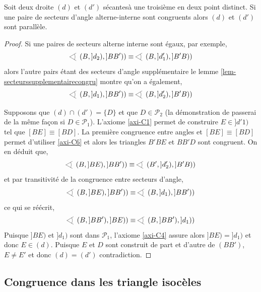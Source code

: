 \begin{thm}
    Soit deux droite $(d)$ et $(d')$ sécantesà une troisième en deux point distinct. Si une paire de secteurs d'angle alterne-interne sont congruents alors $(d)$ et $(d')$ sont parallèle.  
\begin{proof}
    Si une paires de secteurs alterne interne sont égaux, par exemple,
    \begin{equation*}
        \anglesaillant\left(B,]d_2),]BB')\right) \equiv \anglesaillant\left(B,]d_1'),]B'B)\right)
    \end{equation*}
    alors l'autre pairs étant des secteurs d'angle supplémentaire le lemme \ref{lem-secteurssupplementairecongru} montre qu'on a également,
    \begin{equation*}
        \anglesaillant\left(B,]d_1),]BB')\right) \equiv \anglesaillant\left(B,]d_2'),]B'B)\right)
    \end{equation*}

    Supposons que $(d)\cap(d')=\{D\}$ et que $D \in \mathcal{P}_2$ (la démonstration de passerai de la même façon si $D\in\mathcal{P}_1$). L'axiome \ref{axi-C1} permet de construire $E\in ]d'1)$ tel que $[BE]\equiv [BD]$. La première congruence entre angles et $[BE]\equiv [BD]$ permet d'utiliser \ref{axi-C6} et alors les triangles $B'B E$ et $BB'D$ sont congruent. On en déduit que,
    \begin{equation*}
        \anglesaillant\left(B,]BE),]BB')\right)\equiv \anglesaillant\left(B',]d_2'),]B'B)\right)
    \end{equation*}
    et par transitivité de la congruence entre secteurs d'angle, 
    \begin{equation*}
        \anglesaillant\left(B,]BE),]BB')\right)\equiv \anglesaillant\left(B,]d_1),]BB')\right) 
    \end{equation*}
    ce qui se réécrit,
    \begin{equation*}
        \anglesaillant\left(B,]BB'),]BE)\right)\equiv \anglesaillant\left(B,]BB'),]d_1)\right) 
    \end{equation*}
    Puisque $]BE)$ et $]d_1)$ sont dans $\mathcal{P}_1$, l'axiome \ref{axi-C4} assure alors $]BE)=]d_1)$ et donc $E\in (d)$. Puisque $E$ et $D$ sont construit de part et d'autre de $(BB')$, $E\neq E'$ et donc $(d)=(d')$ contradiction. 
\end{proof}
\end{thm}

        \subsection{Congruence dans les triangle isocèles}

